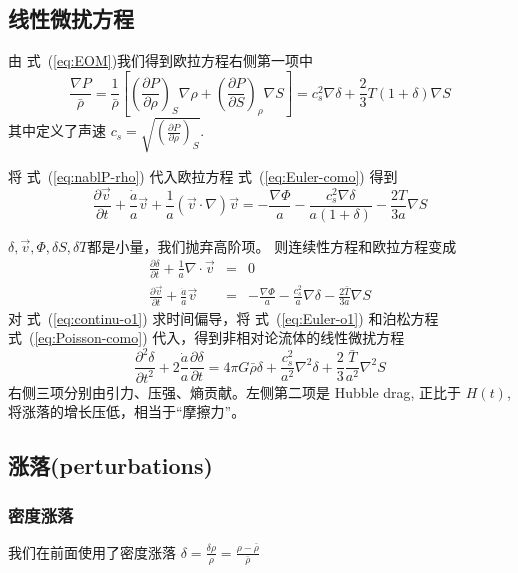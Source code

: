 \documentclass[12pt]{ctexart}
\newcommand{\refeq}[1]{式~(\ref{#1})}
\begin{document}
\subsection{线性微扰方程}
由 \refeq{eq:EOM}我们得到欧拉方程右侧第一项中
\begin{equation} \label{eq:nablP-rho}
    \frac{\nabla P}{\bar{\rho}} = \frac{1}{\bar{\rho}} \left[\left(\frac{\partial P}{\partial \rho}\right)_S \nabla \rho + \left(\frac{\partial P}{\partial S}\right)_\rho \nabla S\right] = c_s^2 \nabla \delta + \frac{2}{3} T\left(1+\delta \right) \nabla S
\end{equation}
其中定义了声速 $c_s=\sqrt{\left(\frac{\partial P}{\partial \rho}\right)_S}$.

将 \refeq{eq:nablP-rho} 代入欧拉方程 \refeq{eq:Euler-como} 得到 
\begin{equation} \label{eq:sEuler}
    \frac{\partial \vec{v}}{\partial t}+\frac{\dot{a}}{a} \vec{v}+\frac{1}{a}(\vec{v} \cdot \nabla) \vec{v}=-\frac{\nabla \Phi}{a} - \frac{c_s^2 \nabla \delta}{a \left(1+\delta \right) } - \frac{2T}{3a}\nabla S
\end{equation}


$\delta, \vec{v}, \Phi, \delta S, \delta T$都是小量，我们抛弃高阶项。
则连续性方程和欧拉方程变成
\begin{eqnarray}
    \frac{\partial \delta }{\partial t} +\frac{1}{a} \nabla \cdot \vec{v} &=& 0  \label{eq:continu-o1} \\ 
    \frac{\partial \vec{v}}{\partial t} + \frac{\dot{a}}{a}\vec{v} &=& -\frac{\nabla \Phi}{a} - \frac{c_s^2}{a}\nabla \delta - \frac{2\bar{T}}{3 a}\nabla S \label{eq:Euler-o1}
\end{eqnarray}
对 \refeq{eq:continu-o1} 求时间偏导，将 \refeq{eq:Euler-o1} 和泊松方程 \refeq{eq:Poisson-como} 代入，得到非相对论流体的线性微扰方程
\begin{equation} \label{eq:linear_pertur}
    \frac{\partial^{2} \delta}{\partial t^{2}}+2 \frac{\dot{a}}{a} \frac{\partial \delta}{\partial t}=4 \pi G \bar{\rho} \delta+\frac{c_{s}^{2}}{a^{2}} \nabla^{2} \delta+\frac{2}{3} \frac{\bar{T}}{a^{2}} \nabla^{2} S
\end{equation}
右侧三项分别由引力、压强、熵贡献。左侧第二项是 Hubble drag, 正比于 $H(t)$, 将涨落的增长压低，相当于“摩擦力”。

\subsection{涨落(perturbations)}
\subsubsection{密度涨落}
我们在前面使用了密度涨落 
$\delta = \frac{\delta \rho}{\rho} = \frac{\rho -\bar{\rho}}{\bar{\rho}}$
\end{document}
